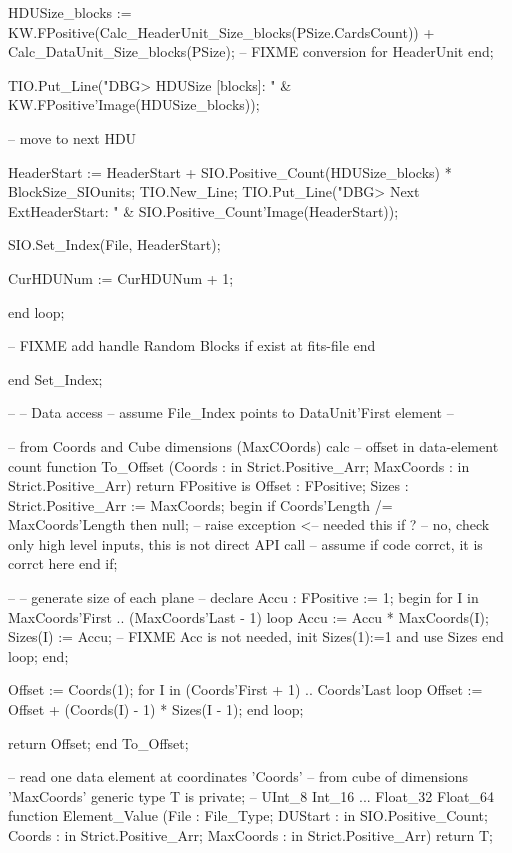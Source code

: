                  	HDUSize_blocks := KW.FPositive(Calc_HeaderUnit_Size_blocks(PSize.CardsCount))
					+ Calc_DataUnit_Size_blocks(PSize); 
					-- FIXME conversion for HeaderUnit
                end;

                TIO.Put_Line("DBG> HDUSize [blocks]: "
                                        & KW.FPositive'Image(HDUSize_blocks));

                -- move to next HDU

                HeaderStart := HeaderStart
                                + SIO.Positive_Count(HDUSize_blocks) * BlockSize_SIOunits;
                TIO.New_Line;
                TIO.Put_Line("DBG> Next ExtHeaderStart: " & SIO.Positive_Count'Image(HeaderStart));

                SIO.Set_Index(File, HeaderStart);

                CurHDUNum := CurHDUNum + 1;

        end loop;

-- FIXME add handle Random Blocks if exist at fits-file end 

end Set_Index;

--
-- Data access
-- assume File_Index points to DataUnit'First element
--

-- from Coords and Cube dimensions (MaxCOords) calc
-- offset in data-element count
function To_Offset (Coords    : in  Strict.Positive_Arr;
                     MaxCoords : in  Strict.Positive_Arr)
   return FPositive
 is
  Offset : FPositive;
  Sizes  : Strict.Positive_Arr := MaxCoords;
 begin
  if Coords'Length /= MaxCoords'Length
  then
   null;
   -- raise exception <-- needed this if ?
   -- no, check only high level inputs, this is not direct API call
   -- assume if code corrct, it is corrct here
  end if;

  --  
  -- generate size of each plane
  --  
  declare
    Accu  : FPositive := 1;
  begin
    for I in MaxCoords'First .. (MaxCoords'Last - 1)
    loop
     Accu := Accu * MaxCoords(I);
     Sizes(I) := Accu;
     -- FIXME Acc is not needed, init Sizes(1):=1 and use Sizes
    end loop;
  end;

  Offset := Coords(1);
  for I in (Coords'First + 1) .. Coords'Last
  loop
   Offset := Offset + (Coords(I) - 1) * Sizes(I - 1); 
  end loop;

  return Offset;
 end To_Offset;



-- read one data element at coordinates 'Coords'
-- from cube of dimensions 'MaxCoords'
generic
	type T is private; -- UInt_8 Int_16 ... Float_32 Float_64
function Element_Value
		(File : File_Type; 
		DUStart   : in SIO.Positive_Count;
		Coords    : in Strict.Positive_Arr;
		MaxCoords : in Strict.Positive_Arr)
 return T;

